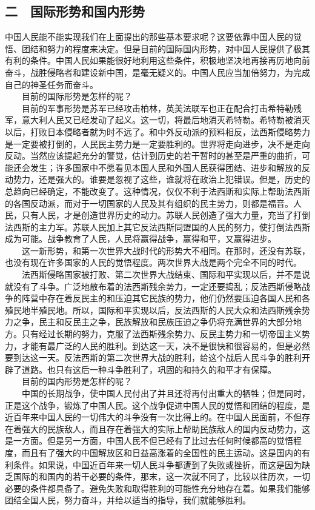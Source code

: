 \documentclass[cn,11pt,chinese]{elegantbook}
\def\myformat#1{\hfil\hfil #1}
\begin{document}
\subsection*{\myformat{二　国际形势和国内形势}}
中国人民能不能实现我们在上面提出的那些基本要求呢？这要依靠中国人民的觉悟、团结和努力的程度来决定。但是目前的国际国内形势，对中国人民提供了极其有利的条件。中国人民如果能很好地利用这些条件，积极地坚决地再接再厉地向前奋斗，战胜侵略者和建设新中国，是毫无疑义的。中国人民应当加倍努力，为完成自己的神圣任务而奋斗。\\
　　目前的国际形势是怎样的呢？\\
　　目前的军事形势是苏军已经攻击柏林，英美法联军也正在配合打击希特勒残军，意大利人民又已经发动了起义。这一切，将最后地消灭希特勒。希特勒被消灭以后，打败日本侵略者就为时不远了。和中外反动派的预料相反，法西斯侵略势力是一定要被打倒的，人民民主势力是一定要胜利的。世界将走向进步，决不是走向反动。当然应该提起充分的警觉，估计到历史的若干暂时的甚至是严重的曲折，可能还会发生；许多国家中不愿看见本国人民和外国人民获得团结、进步和解放的反动势力，还是强大的。谁要是忽视了这些，谁就将在政治上犯错误。但是，历史的总趋向已经确定，不能改变了。这种情况，仅仅不利于法西斯和实际上帮助法西斯的各国反动派，而对于一切国家的人民及其有组织的民主势力，则都是福音。人民，只有人民，才是创造世界历史的动力。苏联人民创造了强大力量，充当了打倒法西斯的主力军。苏联人民加上其它反法西斯同盟国的人民的努力，使打倒法西斯成为可能。战争教育了人民，人民将赢得战争，赢得和平，又赢得进步。\\
　　这一新形势，和第一次世界大战时代的形势大不相同。在那时，还没有苏联，也没有现在许多国家的人民的觉悟程度。两次世界大战是两个完全不同的时代。\\
　　法西斯侵略国家被打败、第二次世界大战结束、国际和平实现以后，并不是说就没有了斗争。广泛地散布着的法西斯残余势力，一定还要捣乱；反法西斯侵略战争的阵营中存在着反民主的和压迫其它民族的势力，他们仍然要压迫各国人民和各殖民地半殖民地。所以，国际和平实现以后，反法西斯的人民大众和法西斯残余势力之争，民主和反民主之争，民族解放和民族压迫之争仍将充满世界的大部分地方。只有经过长期的努力，克服了法西斯残余势力、反民主势力和一切帝国主义势力，才能有最广泛的人民的胜利。到达这一天，决不是很快和很容易的，但是必然要到达这一天。反法西斯的第二次世界大战的胜利，给这个战后人民斗争的胜利开辟了道路。也只有这后一种斗争胜利了，巩固的和持久的和平才有保障。\\
　　目前的国内形势是怎样的呢？\\
　　中国的长期战争，使中国人民付出了并且还将再付出重大的牺牲；但是同时，正是这个战争，锻炼了中国人民。这个战争促进中国人民的觉悟和团结的程度，是近百年来中国人民的一切伟大的斗争没有一次比得上的。在中国人民面前，不但存在着强大的民族敌人，而且存在着强大的实际上帮助民族敌人的国内反动势力，这是一方面。但是另一方面，中国人民不但已经有了比过去任何时候都高的觉悟程度，而且有了强大的中国解放区和日益高涨着的全国性的民主运动。这是国内的有利条件。如果说，中国近百年来一切人民斗争都遭到了失败或挫折，而这是因为缺乏国际的和国内的若干必要的条件，那末，这一次就不同了，比较以往历次，一切必要的条件都具备了。避免失败和取得胜利的可能性充分地存在着。如果我们能够团结全国人民，努力奋斗，并给以适当的指导，我们就能够胜利。\\
\end{document}
